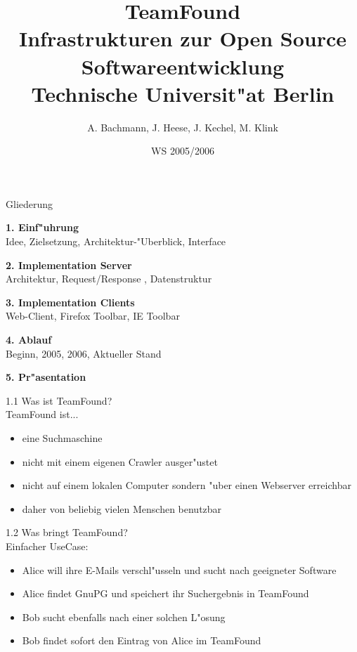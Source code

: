 \documentclass[landscape]{slides}
\begin{document}
%
\title{TeamFound\\Infrastrukturen zur Open Source Softwareentwicklung\\Technische Universit"at Berlin}
\author{A. Bachmann, J. Heese, J. Kechel, M. Klink}
\date{WS 2005/2006}

%
\maketitle%
%
\begin{slide}{Gliederung}

\textbf{1. Einf"uhrung}\\
Idee, Zielsetzung, Architektur-"Uberblick, Interface

\textbf{2. Implementation Server}\\
Architektur, Request/Response , Datenstruktur 

\textbf{3. Implementation Clients}\\
Web-Client, Firefox Toolbar, IE Toolbar

\textbf{4. Ablauf}\\
Beginn, 2005, 2006, Aktueller Stand

\textbf{5. Pr"asentation}
\end{slide}
%
%
%
%
\begin{slide}{1.1 Was ist TeamFound?}\\

TeamFound ist...

\begin{itemize}
\item eine Suchmaschine
\item nicht mit einem eigenen Crawler ausger"ustet
\item nicht auf einem lokalen Computer sondern "uber einen Webserver erreichbar
\item daher von beliebig vielen Menschen benutzbar
\end{itemize}

\end{slide}
%
\begin{slide}{1.2 Was bringt TeamFound?}\\

Einfacher UseCase:

\begin{itemize}
\item Alice will ihre E-Mails verschl"usseln und sucht nach geeigneter Software
\item Alice findet GnuPG und speichert ihr Suchergebnis in TeamFound
\item Bob sucht ebenfalls nach einer solchen L"osung
\item Bob findet sofort den Eintrag von Alice im TeamFound
\end{itemize}
\end{slide}
\end{document}
